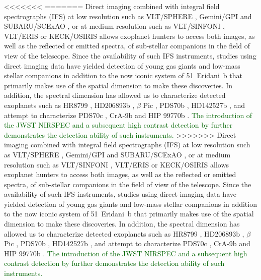 \documentclass{aa}
\newcommand{\newchange}[1]{\textcolor{darkgreen}{#1}}
\begin{document}
{%
<<<<<<<
=======
Direct imaging combined with integral field spectrographs (IFS) at low resolution such as VLT/SPHERE \citep{2019Beuzit}, Gemini/GPI \citep{2014MacintoshGPI} and SUBARU/SCExAO \citep{2015SCeXAO}, or at medium resolution such as VLT/SINFONI \citep{2004SINFONI}, VLT/ERIS \citep{2023Davies} or KECK/OSIRIS \citep{2000OSIRIS} allows exoplanet hunters to access both images, as well as the reflected or emitted spectra, of sub-stellar companions in the field of view of the telescope.
Since the availability of such IFS instruments, studies using direct imaging data have yielded detection of young gas giants \citep[e.g., PDS70b, ][]{2018KepplerPDS70} and low-mass stellar companions \citep[e.g., HD142527B, ][]{2019ClaudiHD142527b} in addition to the now iconic system of 51~Eridani~b \citep{2015MacintoshEridani} that primarily makes use of the spatial dimension to make these discoveries.
In addition, the spectral dimension has allowed us to characterize detected exoplanets such as HR8799 \citep[e.g][]{2008Marois, 2013Konopacky}, HD206893b \citep[][]{2017DelormeHD206893b}, $\beta$ Pic \citep[][]{2017ChilcoteBetapic}, PDS70b \citep[e.g][]{2018MullerPDS70,2019ChristiaensPDS70}, HD142527b \citep[][]{2018A&ChristiaensHD142527}, and attempt to characterize PDS70c \citep[][]{2019MesaPDS70}, CrA-9b \citep[][]{2021ChristiaensCrA-9b} and HIP 99770b \citep[][]{2023Currie}.
\newchange{The introduction of the JWST NIRSPEC \citet{2022BokerJWST} and a subsequent high contrast detection by \citet{2023RuffioJWST} further demonstrates the detection ability of such instruments.}
>>>>>>>
Direct imaging combined with integral field spectrographs (IFS) at low resolution such as VLT/SPHERE \citep{2019Beuzit}, Gemini/GPI \citep{2014MacintoshGPI} and SUBARU/SCExAO \citep{2015SCeXAO}, or at medium resolution such as VLT/SINFONI \citep{2004SINFONI}, VLT/ERIS \citep{2023Davies} or KECK/OSIRIS \citep{2000OSIRIS} allows exoplanet hunters to access both images, as well as the reflected or emitted spectra, of sub-stellar companions in the field of view of the telescope.
Since the availability of such IFS instruments, studies using direct imaging data have yielded detection of young gas giants \citep[e.g., PDS70b, ][]{2018KepplerPDS70} and low-mass stellar companions \citep[e.g., HD142527B, ][]{2019ClaudiHD142527b} in addition to the now iconic system of 51~Eridani~b \citep{2015MacintoshEridani} that primarily makes use of the spatial dimension to make these discoveries.
In addition, the spectral dimension has allowed us to characterize detected exoplanets such as HR8799 \citep[e.g][]{2008Marois, 2013Konopacky}, HD206893b \citep[][]{2017DelormeHD206893b}, $\beta$ Pic \citep[][]{2017ChilcoteBetapic}, PDS70b \citep[e.g][]{2018MullerPDS70,2019ChristiaensPDS70}, HD142527b \citep[][]{2018A&ChristiaensHD142527}, and attempt to characterize PDS70c \citep[][]{2019MesaPDS70}, CrA-9b \citep[][]{2021ChristiaensCrA-9b} and HIP 99770b \citep[][]{2023Currie}.
\newchange{The introduction of the JWST NIRSPEC \citet{2022BokerJWST} and a subsequent high contrast detection by \citet{2023RuffioJWST} further demonstrates the detection ability of such instruments.}

}
\end{document}
